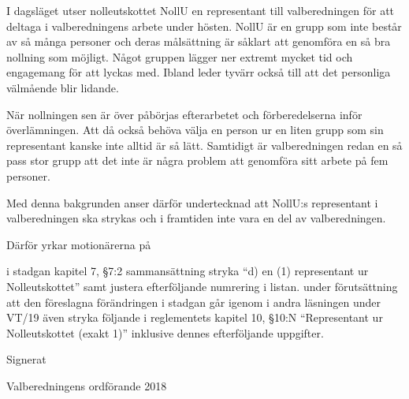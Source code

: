 \documentclass[../_main/handlingar.tex]{subfiles}
\begin{document}
I dagsläget utser nolleutskottet NollU en representant till valberedningen för att deltaga i valberedningens arbete under hösten. NollU är en grupp som inte består av så många personer och deras målsättning är såklart att genomföra en så bra nollning som möjligt. Något gruppen lägger ner extremt mycket tid och engagemang för att lyckas med. Ibland leder tyvärr också till att det personliga välmående blir lidande. 

När nollningen sen är över påbörjas efterarbetet och förberedelserna inför överlämningen. Att då också behöva välja en person ur en liten grupp som sin representant kanske inte alltid är så lätt. Samtidigt är valberedningen redan en så pass stor grupp att det inte är några problem att genomföra sitt arbete på fem personer. 

Med denna bakgrunden anser därför undertecknad att NollU:s representant i valberedningen ska strykas och i framtiden inte vara en del av valberedningen. 

Därför yrkar motionärerna på
\begin{attsatser}
  \att i stadgan kapitel 7, §7:2 sammansättning stryka ``d) en (1) representant ur Nolleutskottet'' samt justera efterföljande numrering i listan.
  \att under förutsättning att den föreslagna förändringen i stadgan går igenom i andra läsningen under VT/19 även stryka följande i reglementets kapitel 10, §10:N ``Representant ur Nolleutskottet (exakt 1)'' inklusive dennes efterföljande uppgifter.
\end{attsatser}

\begin{signatures}{1}
    Signerat
    \signature{Pontus Landgren}{Valberedningens ordförande 2018}

\end{signatures}
\end{document}
